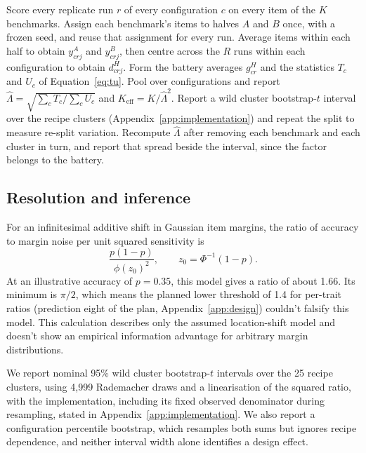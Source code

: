 \documentclass{article}
\newcommand{\Lam}{\Lambda}
\begin{document}
\begin{algorithm}[t]
\caption{SNAP measurement recipe for a fixed battery of $K$ benchmarks scored on $R$ replicate runs per configuration. The primary analysis below used a random frozen split and checked a passage-aware split, and the registered test kept passage-linked items in one half.}
\label{alg:snap}
\begin{algorithmic}[1]
\STATE Score every replicate run $r$ of every configuration $c$ on every item of the $K$ benchmarks.
\STATE Assign each benchmark's items to halves $A$ and $B$ once, with a frozen seed, and reuse that assignment for every run.
\STATE Average items within each half to obtain $y^A_{crj}$ and $y^B_{crj}$, then centre across the $R$ runs within each configuration to obtain $d^H_{crj}$.
\STATE Form the battery averages $g^H_{cr}$ and the statistics $T_c$ and $U_c$ of Equation~\ref{eq:tu}.
\STATE Pool over configurations and report $\widehat\Lam=\sqrt{\sum_c T_c/\sum_c U_c}$ and $K_{\mathrm{eff}}=K/\widehat\Lam^2$.
\STATE Report a wild cluster bootstrap-$t$ interval over the recipe clusters (Appendix~\ref{app:implementation}) and repeat the split to measure re-split variation.
\STATE Recompute $\widehat\Lam$ after removing each benchmark and each cluster in turn, and report that spread beside the interval, since the factor belongs to the battery.
\end{algorithmic}
\end{algorithm}


\subsection{Resolution and inference}
For an infinitesimal additive shift in Gaussian item margins, the ratio of accuracy to margin noise per unit squared sensitivity is
\begin{equation}
\frac{p(1-p)}{\phi(z_0)^2},\qquad z_0=\Phi^{-1}(1-p).
\label{eq:information}
\end{equation}
At an illustrative accuracy of $p=0.35$, this model gives a ratio of about 1.66. Its minimum is $\pi/2$, which means the planned lower threshold of 1.4 for per-trait ratios (prediction eight of the plan, Appendix~\ref{app:design}) couldn't falsify this model. This calculation describes only the assumed location-shift model and doesn't show an empirical information advantage for arbitrary margin distributions.

We report nominal 95\% wild cluster bootstrap-$t$ intervals over the 25 recipe clusters, using 4,999 Rademacher draws and a linearisation of the squared ratio, with the implementation, including its fixed observed denominator during resampling, stated in Appendix~\ref{app:implementation}. We also report a configuration percentile bootstrap, which resamples both sums but ignores recipe dependence, and neither interval width alone identifies a design effect.
\end{document}
